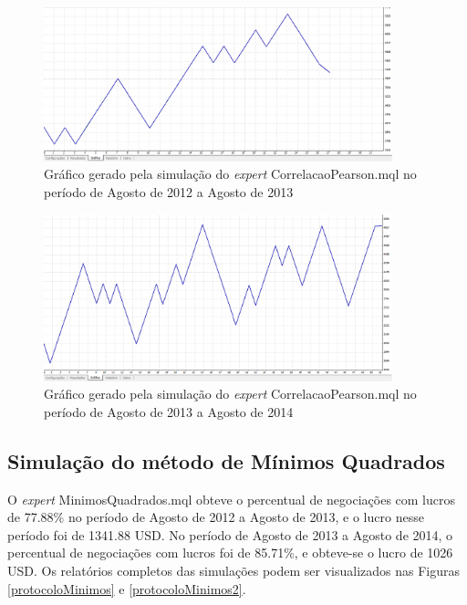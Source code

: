 \begin{figure}[H]
\centering
\includegraphics[width=0.9\textwidth]{figuras/protocoloCorrelacao3}
\caption{Gráfico gerado pela simulação do \textit{expert} CorrelacaoPearson.mql no período de Agosto de 2012 a Agosto de 2013}
\label{protocoloCorrelacao3}
\end{figure}

\begin{figure}[H]
\centering
\includegraphics[width=0.9\textwidth]{figuras/protocoloCorrelacao4}
\caption{Gráfico gerado pela simulação do \textit{expert} CorrelacaoPearson.mql no período de Agosto de 2013 a Agosto de 2014}
\label{protocoloCorrelacao4}
\end{figure}

\subsection{Simulação do método de Mínimos Quadrados}

O \textit{expert} MinimosQuadrados.mql obteve o percentual de negociações com lucros de 77.88\% no período de Agosto de 2012 a Agosto de 2013, e o  lucro nesse período foi de 1341.88 USD. No período de Agosto de 2013 a Agosto de 2014, o percentual de negociações com lucros foi de 85.71\%,  e obteve-se o lucro de 1026 USD. 
Os relatórios completos das simulações podem ser visualizados nas Figuras \ref{protocoloMinimos} e \ref{protocoloMinimos2}.

